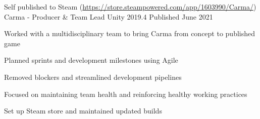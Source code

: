 

\begin{cventries}

    \cventry
    {Self published to Steam (\href{https://store.steampowered.com/app/1603990/Carma/}{https://store.steampowered.com/app/1603990/Carma/})}
    {Carma - Producer \& Team Lead}
    {Unity 2019.4}
    {Published June 2021}
    {
        \begin{cvitems}
            \item Worked with a multidisciplinary team to bring Carma from concept to published game
            \item Planned sprints and development milestones using Agile
            \item Removed blockers and streamlined development pipelines
            \item Focused on maintaining team health and reinforcing healthy working practices
            \item Set up Steam store and maintained updated builds
        \end{cvitems}
    }


\end{cventries}
